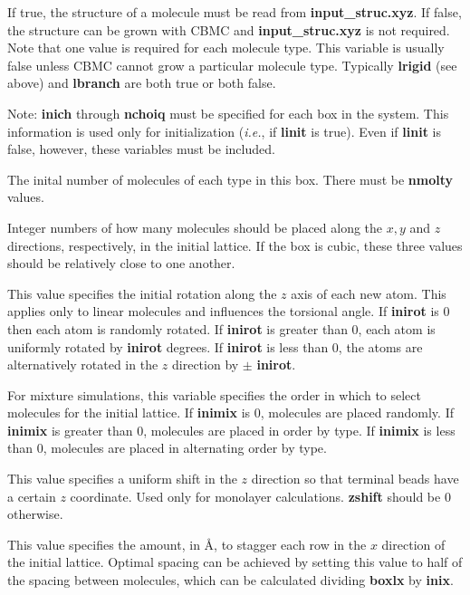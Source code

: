 \documentclass[12pt,letterpaper]{article}
\begin{document}
 If true, the structure of a molecule must be read from 
{\textbf{input\_struc.xyz}}.  If false, the structure can be grown with CBMC and 
{\textbf{input\_struc.xyz}} is not required.
Note that one value is required for each molecule type.  This variable is usually false
unless CBMC cannot grow a particular molecule type.
Typically {\textbf{lrigid}} (see above) and {\textbf{lbranch}} are both true or both false.

\noindent Note: \textbf{inich} through \textbf{nchoiq} must be specified for each box in the system.
This information is used only for initialization ({\textit{i.e.}}, if {\textbf{linit}} is true).  
Even if {\textbf{linit}} is false, however, these variables must be included.

 The inital number of molecules of each type in this box.  
There must be {\textbf{nmolty}} values.

 Integer numbers of how many molecules
should be placed along the $x, y$ and $z$ directions, respectively, in the initial
lattice.  If the box is cubic, these three values should be relatively close to one another.

 This value specifies the initial rotation along the $z$ axis of each new atom.
This applies only to linear molecules and influences the torsional angle.
If {\textbf{inirot}} is 0 then each atom is randomly rotated.  If {\textbf{inirot}} is greater than 0, 
each atom is uniformly rotated by {\textbf{inirot}} degrees.  
If {\textbf{inirot}} is less than 0, the atoms are alternatively rotated in the $z$ direction by {$\mathbf {\pm}$ \textbf{inirot}}.  

 For mixture simulations, this variable specifies the order
in which to select molecules for the initial lattice. 
If {\textbf{inimix}} is 0, molecules are placed randomly.
If {\textbf{inimix}} is greater than 0, molecules are placed in order by type.
If {\textbf{inimix}} is less than 0, molecules are placed in alternating order by type.

 This value specifies a uniform shift in the $z$ direction so
that terminal beads have a certain $z$ coordinate.  Used only for monolayer calculations.
{\textbf{zshift}} should be 0 otherwise.

 This value specifies the amount, in {\AA}, to stagger each row in the $x$
direction of the initial lattice.  
Optimal spacing can be achieved by setting this value to half of the spacing between molecules,
which can be calculated dividing {\textbf {boxlx}} by {\textbf {inix}}.
\end{document}
